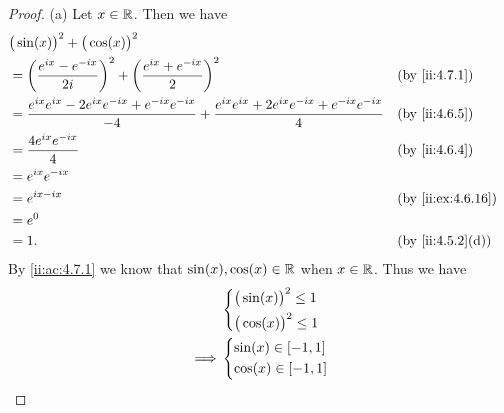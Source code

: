 \begin{proof}{(a)}
  Let \(x \in \mathbb{R}\).
  Then we have
  \begin{align*}
     & \big(\sin(x)\big)^2 + \big(\cos(x)\big)^2                                                                                                                                 \\
     & = \bigg(\dfrac{e^{i x} - e^{- i x}}{2i}\bigg)^2 + \bigg(\dfrac{e^{i x} + e^{- i x}}{2}\bigg)^2                                                     &  & \by{ii:4.7.1}     \\
     & = \dfrac{e^{i x} e^{i x} - 2 e^{i x} e^{- i x} + e^{- i x} e^{- i x}}{-4} + \dfrac{e^{i x} e^{i x} + 2 e^{i x} e^{- i x} + e^{- i x} e^{- i x}}{4} &  & \by{ii:4.6.5}     \\
     & = \dfrac{4 e^{i x} e^{- i x}}{4}                                                                                                                   &  & \by{ii:4.6.4}     \\
     & = e^{i x} e^{- i x}                                                                                                                                                       \\
     & = e^{i x - i x}                                                                                                                                    &  & \by{ii:ex:4.6.16} \\
     & = e^0                                                                                                                                                                     \\
     & = 1.                                                                                                                                               &  & \by{ii:4.5.2}[d]
  \end{align*}
  By \cref{ii:ac:4.7.1} we know that \(\sin(x), \cos(x) \in \mathbb{R}\) when \(x \in \mathbb{R}\).
  Thus we have
  \begin{align*}
             & \begin{dcases}
                 \big(\sin(x)\big)^2 \leq 1 \\
                 \big(\cos(x)\big)^2 \leq 1
               \end{dcases} \\
    \implies & \begin{dcases}
                 \sin(x) \in [-1, 1] \\
                 \cos(x) \in [-1, 1]
               \end{dcases}
  \end{align*}
\end{proof}

